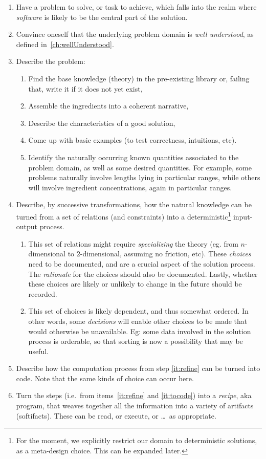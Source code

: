 \documentclass[10pt,twoside,onecolumn,openany,letterpaper]{memoir}
\begin{document}
\begin{enumerate}
\item\label{it:problem} Have a problem to solve, or task to achieve, which
falls into the realm where \emph{software} is likely to be the central part of
the solution.
\item\label{it:understood} Convince oneself that the underlying problem domain
is \emph{well understood}, as defined in~\autoref{ch:wellUnderstood}.
\item\label{it:probdesc} Describe the problem:
  \begin{enumerate}
  \item Find the base knowledge (theory) in the pre-existing library
    or, failing that, write it if it does not yet exist,
  \item Assemble the ingredients into a coherent narrative,
  \item Describe the characteristics of a good solution,
  \item Come up with basic examples (to test correctness, intuitions, etc).
  \item Identify the naturally occurring known quantities associated to the
    problem domain, as well as some desired quantities. For example,
    some problems naturally involve lengths lying in particular
    ranges, while others will involve ingredient concentrations, again
    in particular ranges.
  \end{enumerate}
\item\label{it:refine} Describe, by successive transformations, how the natural
knowledge can be turned from a set of relations (and constraints) into a
deterministic\footnote{For the moment, we explicitly restrict our domain to
deterministic solutions, as a meta-design choice. This can be expanded later.}
input-output process.
  \begin{enumerate}
  \item This set of relations might require \emph{specializing} the
    theory (eg. from $n$-dimensional to $2$-dimensional, assuming no
    friction, etc).  These \emph{choices} need to be documented, and are
    a crucial aspect of the solution process. The \emph{rationale} for the
    choices should also be documented. Lastly, whether these choices are
    likely or unlikely to change in the future should be recorded.
  \item This set of choices is likely dependent, and thus somewhat ordered.
  In other words, some \emph{decisions} will enable other choices to be
  made that would otherwise be unavailable. Eg: some data involved in the
  solution process is orderable, so that sorting is now a possibility that
  may be useful.
  \end{enumerate}
\item\label{it:tocode} Describe how the computation process from step
\ref{it:refine} can be turned into code. Note that the same kinds of choice
can occur here.
\item\label{it:recipe} Turn the steps (i.e.\ from items~\ref{it:refine} and
\ref{it:tocode}) into a \emph{recipe}, aka program, that weaves together
all the information into a variety of artifacts (softifacts). These can
be read, or execute, or \ldots\ as appropriate.
\end{enumerate}
\end{document}
